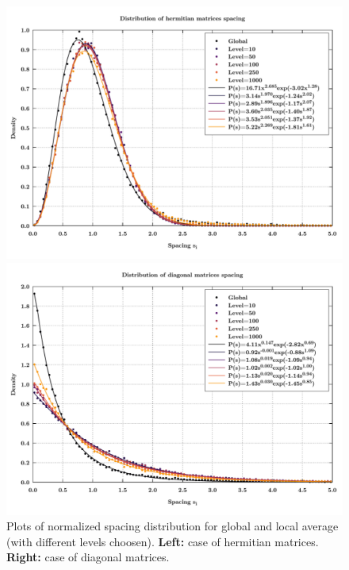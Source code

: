 \documentclass[rmp,10pt,onecolumn,fleqn,notitlepage]{revtex4-1}
\begin{document}
\begin{figure}[h!]
\begin{minipage}[c]{0.49\linewidth}
\centering
\includegraphics[width=1\textwidth]{image/hist_hermitian-local.pdf}
\end{minipage}
\begin{minipage}[]{0.5\linewidth}
\centering
\includegraphics[width=1\textwidth]{image/hist_diagonal-local.pdf}
\end{minipage}
\caption{\label{fig:results} Plots of normalized spacing distribution for global and local average (with different levels choosen). \textbf{Left:} case of hermitian matrices. \textbf{Right:} case of diagonal matrices. }
\end{figure}
\end{document}
